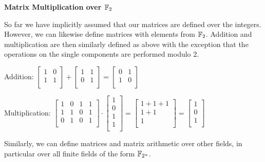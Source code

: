 \textbf{\large Matrix Multiplication over $\mathbb{F}_2$} 

So far we have implicitly assumed that our matrices are defined over the
integers. However, we can likewise define matrices with elements from $\mathbb{F}_2$.
Addition and multiplication are then similarly defined as above with the
exception that the operations on the single components are performed modulo $2$.

\example Addition: $\begin{bmatrix} 1 & 0\\ 1 & 1\\\end{bmatrix}+
\begin{bmatrix} 1 & 1\\ 0 & 1\\\end{bmatrix} = 
\begin{bmatrix} 0 & 1\\ 1 & 0\\\end{bmatrix}
$ 

\example Multiplication: $\begin{bmatrix} 1 & 0 & 1 & 1\\ 1 & 1 & 0 & 1\\ 0 & 1 & 0 & 1\\\end{bmatrix}\cdot
\begin{bmatrix} 1 \\ 0\\ 1\\ 1\\\end{bmatrix} = 
\begin{bmatrix} 1+1+1 \\ 1+1\\ 1 \\\end{bmatrix}=
\begin{bmatrix} 1 \\ 0\\ 1 \\\end{bmatrix}
$


Similarly, we can define matrices and matrix arithmetic over other fields, in
particular over all finite fields of the form $\mathbb{F}_{2^n}$.

\endMaths\fi



